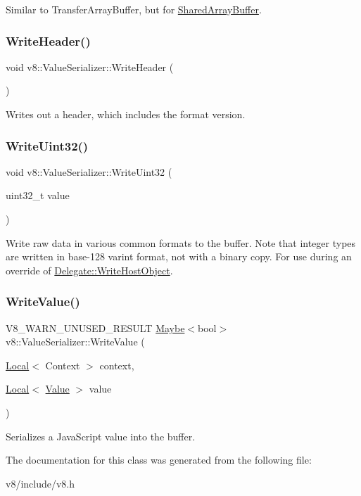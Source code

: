 Similar to Transfer\+Array\+Buffer, but for \mbox{\hyperlink{classv8_1_1SharedArrayBuffer}{Shared\+Array\+Buffer}}. \mbox{\label{classv8_1_1ValueSerializer_ac0bdf1a7731ee4e93823dabdfa8c8661}} 
\subsubsection{\texorpdfstring{Write\+Header()}{WriteHeader()}}
{\footnotesize\ttfamily void v8\+::\+Value\+Serializer\+::\+Write\+Header (\begin{DoxyParamCaption}{ }\end{DoxyParamCaption})}

Writes out a header, which includes the format version. \mbox{\label{classv8_1_1ValueSerializer_a8345af97eb58727384cab6a2738924d1}} 
\subsubsection{\texorpdfstring{Write\+Uint32()}{WriteUint32()}}
{\footnotesize\ttfamily void v8\+::\+Value\+Serializer\+::\+Write\+Uint32 (\begin{DoxyParamCaption}\item[{uint32\+\_\+t}]{value }\end{DoxyParamCaption})}

Write raw data in various common formats to the buffer. Note that integer types are written in base-\/128 varint format, not with a binary copy. For use during an override of \mbox{\hyperlink{classv8_1_1ValueSerializer_1_1Delegate_ae97808060b22d7a94517f725922b72c6}{Delegate\+::\+Write\+Host\+Object}}. \mbox{\label{classv8_1_1ValueSerializer_a32b08083cb7d83bf3b117b61f327ea23}} 
\subsubsection{\texorpdfstring{Write\+Value()}{WriteValue()}}
{\footnotesize\ttfamily V8\+\_\+\+W\+A\+R\+N\+\_\+\+U\+N\+U\+S\+E\+D\+\_\+\+R\+E\+S\+U\+LT \mbox{\hyperlink{classv8_1_1Maybe}{Maybe}}$<$bool$>$ v8\+::\+Value\+Serializer\+::\+Write\+Value (\begin{DoxyParamCaption}\item[{\mbox{\hyperlink{classv8_1_1Local}{Local}}$<$ Context $>$}]{context,  }\item[{\mbox{\hyperlink{classv8_1_1Local}{Local}}$<$ \mbox{\hyperlink{classv8_1_1Value}{Value}} $>$}]{value }\end{DoxyParamCaption})}

Serializes a Java\+Script value into the buffer. 

The documentation for this class was generated from the following file\+:\begin{DoxyCompactItemize}
\item 
v8/include/v8.\+h\end{DoxyCompactItemize}
